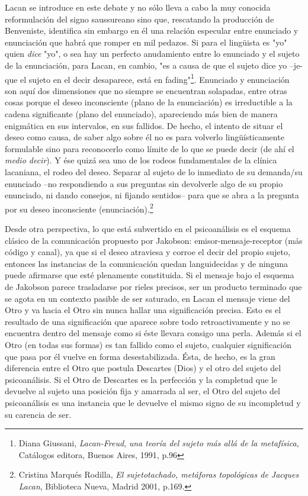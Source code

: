 \documentclass{book}
\begin{document}
Lacan se introduce en este debate y no sólo lleva a cabo la muy conocida
reformulación del signo saussureano sino que, rescatando la producción
de Benveniste, identifica sin embargo en él una relación especular entre
enunciado y enunciación que habrá que romper en mil pedazos. Si para el
lingüista es "yo" quien \emph{dice} "yo", o sea hay un perfecto
anudamiento entre lo enunciado y el sujeto de la enunciación, para
Lacan, en cambio, "es a causa de que el sujeto dice yo --je- que el
sujeto en el decir desaparece, está en fading"\footnote{Diana Giussani,
  \emph{Lacan-Freud}, \emph{una teoría del sujeto más allá de la
  metafísica,} Catálogos editora, Buenos Aires, 1991, p.96}. Enunciado y
enunciación son aquí dos dimensiones que no siempre se encuentran
solapadas, entre otras cosas porque el deseo inconsciente (plano de la
enunciación) es irreductible a la cadena significante (plano del
enunciado), apareciendo más bien de manera enigmática en sus intervalos,
en sus fallidos. De hecho, el intento de situar el deseo como causa, de
saber algo sobre él no es para volverlo lingüísticamente formulable sino
para reconocerlo como límite de lo que se puede decir (de ahí el
\emph{medio decir}). Y ése quizá sea uno de los rodeos fundamentales de
la clínica lacaniana, el rodeo del deseo. Separar al sujeto de lo
inmediato de su demanda/su enunciado --no respondiendo a sus preguntas
sin devolverle algo de su propio enunciado, ni dando consejos, ni
fijando sentidos-- para que se abra a la pregunta por su deseo
inconsciente (enunciación).\footnote{Cristina Marqués Rodilla, \emph{El
  sujetotachado, metáforas topológicas de Jacques Lacan}, Biblioteca
  Nueva, Madrid 2001, p.169.}

Desde otra perspectiva, lo que está subvertido en el psicoanálisis es el
esquema clásico de la comunicación propuesto por Jakobson:
emisor-mensaje-receptor (más código y canal), ya que si el deseo
atraviesa y corroe el decir del propio sujeto, entonces las instancias
de la comunicación quedan languidecidas y de ninguna puede afirmarse que
esté plenamente constituida. Si el mensaje bajo el esquema de Jakobson
parece trasladarse por rieles precisos, ser un producto terminado que se
agota en un contexto pasible de ser saturado, en Lacan el mensaje viene
del Otro y va hacia el Otro sin nunca hallar una significación precisa.
Esto es el resultado de una significación que aparece sobre todo
retroactivamente y no se encuentra dentro del mensaje como si éste
llevara consigo una perla. Además si el Otro (en todas sus formas) es
tan fallido como el sujeto, cualquier significación que pasa por él
vuelve en forma desestabilizada. Ésta, de hecho, es la gran diferencia
entre el Otro que postula Descartes (Dios) y el otro del sujeto del
psicoanálisis. Si el Otro de Descartes es la perfección y la completud
que le devuelve al sujeto una posición fija y amarrada al ser, el Otro
del sujeto del psicoanálisis es una instancia que le devuelve el mismo
signo de su incompletud y su carencia de ser.
\end{document}
